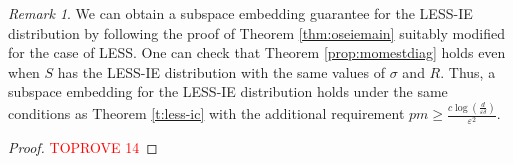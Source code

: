 \documentclass[11pt]{amsart}
\numberwithin{equation}{section}
\numberwithin{equation}{section}
\DeclareMathOperator{\Pb}{\mathbb{P}}
\DeclareMathOperator{\nnz}{nnz}
\DeclarePairedDelimiter{\paren}{(}{)}
\theoremstyle{remark}
\newtheorem{remark}[theorem]{Remark}
\theoremstyle{definition}
\begin{document}
\begin{remark}
    We can obtain a subspace embedding guarantee for the LESS-IE distribution by following the proof of Theorem \ref{thm:oseiemain} suitably modified for the case of LESS. One can check that Theorem \ref{prop:momestdiag} holds even when $S$ has the LESS-IE distribution with the same values of $\sigma$ and $R$. Thus, a subspace embedding for the LESS-IE distribution holds under the same conditions as Theorem \ref{t:less-ic} with the additional requirement $pm \ge \frac{c \log (\frac{d}{\varepsilon \delta})}{\varepsilon^2}$.  
\end{remark}


\begin{comment}
\begin{theorem}[High Probability Bounds for the Embedding Error of LESS-IC]\label{thm:lessdecoup}
Let $S$ be an $m \times n$ matrix distributed according to the $8 \lceil\log (\frac{d}{\varepsilon \delta})\rceil$-wise independent unscaled LESS-IC distribution with parameter $p$ for some fixed matrix $U$ satisfying $U^TU=I$ with given $(\beta_1, \beta_2)$-approximate leverage scores. Then, there exist constants $c_{\ref*{thm:lessdecoup}.1}$ and $c_{\ref*{thm:lessdecoup}.2}$ such that for any $0 < \varepsilon, \delta < 1$ and $d>10$, we have 
\begin{align*}
\Pb \left( 1 - \varepsilon  \leq s_{\min}((1/\sqrt{pm})SU)   \leq s_{\max}((1/\sqrt{pm})SU) \leq 1 + \varepsilon \right) \geq 1-\delta
\end{align*}
when $m \ge c_{\ref*{thm:lessdecoup}.1}  \max \left\{ \frac{d + \log(d/\delta)^2 + \log(1/\varepsilon)}{\varepsilon^2} , \frac{\log(d/\delta)^3}{\varepsilon} \right\}$ and \begin{align*} pm \ge  \min \left \{  c_{\ref*{thm:lessdecoup}.2}\paren*{\frac{(\log ({d/\delta\varepsilon}))^{2.5}}{\varepsilon} + (\log ({d/\delta\varepsilon}))^{3}  }, m  \right \} \end{align*} The matrix $S$ has $O(\beta pmd + n)$ many non zero entries and can be applied to an $n\times d$ matrix $A$ in $O(\nnz(A) + \beta pmd^2)$ time.
\end{theorem}
\end{comment}

\begin{proof}\textcolor{red}{TOPROVE 14}\end{proof}
\end{document}
